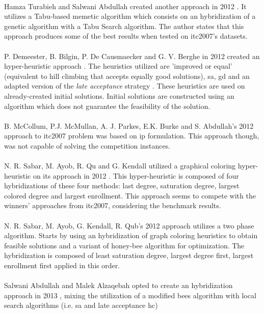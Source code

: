 \\
Hamza Turabieh and Salwani Abdullah created another approach in 2012 \cite{Abdullah2012}. It utilizes a Tabu-based memetic algorithm which consists on an hybridization of a genetic algorithm with a Tabu Search algorithm. The author states that this approach produces some of the best results when tested on \gls{itc2007}'s datasets.\\
\\
P. Demeester, B. Bilgin, P. De Causmaecker and G. V. Berghe in 2012 created an hyper-heuristic approach \cite{Demeester2012}. The heuristics utilized are 'improved or equal' (equivalent to hill climbing that accepts equally good solutions), \gls{sa}, \gls{gd} and an adapted version of the \textit{late acceptance} strategy \cite{Burke2008}. These heuristics are used on already-created initial solutions. Initial solutions are constructed using an algorithm which does not guarantee the feasibility of the solution.\\
\\
B. McCollum, P.J. McMullan, A. J. Parkes, E.K. Burke and S. Abdullah's 2012 approach \cite{McCollum2012} to \gls{itc2007} problem was based on \gls{ip} formulation. This approach though, was not capable of solving the competition instances.\\
\\
N. R. Sabar, M. Ayob, R. Qu and G. Kendall utilized a graphical coloring hyper-heuristic on its approach in 2012 \cite{Sabar2012}. This hyper-heuristic is composed of four hybridizations of these four methods: last degree, saturation degree, largest colored degree and largest enrollment. This approach seems to compete with the winners' approaches from \gls{itc2007}, considering the benchmark results.\\
\\
N. R. Sabar, M. Ayob, G. Kendall, R. Qub's 2012 approach \cite{Sabar2012a} utilizes a two phase algorithm. Starts by using an hybridization of graph coloring heuristics to obtain feasible solutions and a variant of honey-bee algorithm for optimization. The hybridization is composed of least saturation degree, largest degree first, largest enrollment first applied in this order.\\
\\
Salwani Abdullah and Malek Alzaqebah opted to create an hybridization approach in 2013 \cite{Abdullah2013}, mixing the utilization of a modified bees algorithm with local search algorithms (i.e. \gls{sa} and late acceptance \gls{hc})\\
